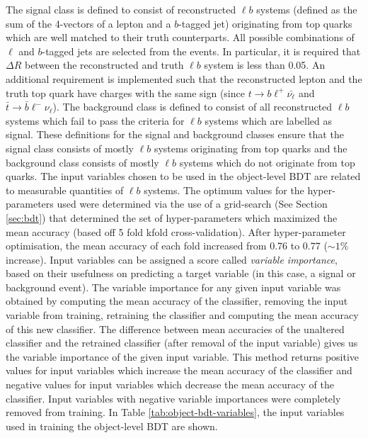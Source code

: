 The signal class is defined to consist of reconstructed $\ell b$ systems (defined as the sum of the 4-vectors of a lepton and a $b$-tagged jet) originating from top quarks which are well matched to their truth counterparts. All possible combinations of $\ell$ and $b$-tagged jets are selected from the events. In particular, it is required that $\Delta R$ between the reconstructed and truth $\ell b$ system is less than 0.05. An additional requirement is implemented such that the reconstructed lepton and the truth top quark have charges with the same sign (since $t\rightarrow b\ell^{+}\bar{\nu_{\ell}}$ and $\bar{t}\rightarrow \bar{b}\ell^{-}\nu_{\ell}$). The background class is defined to consist of all reconstructed $\ell b$ systems which fail to pass the criteria for $\ell b$ systems which are labelled as signal. These definitions for the signal and background classes ensure that the signal class consists of mostly $\ell b$ systems originating from top quarks and the background class consists of mostly $\ell b$ systems which do not originate from top quarks. The input variables chosen to be used in the object-level BDT are related to measurable quantities of $\ell b$ systems. The optimum values for the hyper-parameters used were determined via the use of a grid-search (See Section \ref{sec:bdt}) that determined the set of hyper-parameters which maximized the mean accuracy (based off 5 fold kfold cross-validation). After hyper-parameter optimisation, the mean accuracy of each fold increased from 0.76 to 0.77 ($\sim 1\%$ increase). Input variables can be assigned a score called \textit{variable importance}, based on their usefulness on predicting a target variable (in this case, a signal or background event). The variable importance for any given input variable was obtained by computing the mean accuracy of the classifier, removing the input variable from training, retraining the classifier and computing the mean accuracy of this new classifier. The difference between mean accuracies of the unaltered classifier and the retrained classifier (after removal of the input variable) gives us the variable importance of the given input variable. This method returns positive values for input variables which increase the mean accuracy of the classifier and negative values for input variables which decrease the mean accuracy of the classifier. Input variables with negative variable importances were completely removed from training. In Table \ref{tab:object-bdt-variables}, the input variables used in training the object-level BDT are shown.
